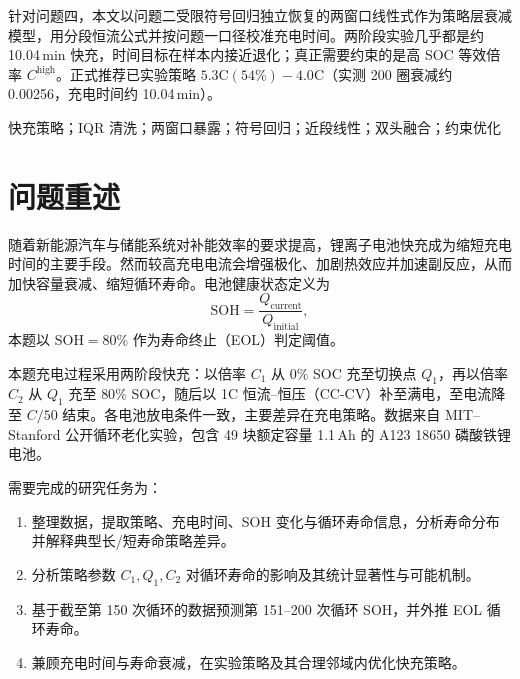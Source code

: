 \documentclass[a4paper,12pt,UTF8,zihao=-4]{ctexart}
\begin{document}
针对问题四，本文以问题二受限符号回归独立恢复的两窗口线性式作为策略层衰减模型，用分段恒流公式并按问题一口径校准充电时间。两阶段实验几乎都是约 10.04\,min 快充，时间目标在样本内接近退化；真正需要约束的是高 SOC 等效倍率 \(C^{\mathrm{high}}\)。正式推荐已实验策略 \(5.3\mathrm{C}(54\%)-4.0\mathrm{C}\)（实测 200 圈衰减约 0.00256，充电时间约 10.04\,min）。

\vspace{0.8em}
快充策略；IQR 清洗；两窗口暴露；符号回归；近段线性；双头融合；约束优化

\clearpage

\section{问题重述}

随着新能源汽车与储能系统对补能效率的要求提高，锂离子电池快充成为缩短充电时间的主要手段。然而较高充电电流会增强极化、加剧热效应并加速副反应，从而加快容量衰减、缩短循环寿命\cite{severson2019datadriven,liu2019fastcharging,ahmed2017enabling}。电池健康状态定义为
\begin{equation}
\mathrm{SOH}=\frac{Q_{\mathrm{current}}}{Q_{\mathrm{initial}}},
\label{eq:soh}
\end{equation}
本题以 \(\mathrm{SOH}=80\%\) 作为寿命终止（EOL）判定阈值。

本题充电过程采用两阶段快充：以倍率 \(C_1\) 从 \(0\%\) SOC 充至切换点 \(Q_1\)，再以倍率 \(C_2\) 从 \(Q_1\) 充至 \(80\%\) SOC，随后以 1C 恒流--恒压（CC-CV）补至满电，至电流降至 \(C/50\) 结束。各电池放电条件一致，主要差异在充电策略。数据来自 MIT--Stanford 公开循环老化实验\cite{severson2019datadriven,matrdataset}，包含 49 块额定容量 1.1\,Ah 的 A123 18650 磷酸铁锂电池。

需要完成的研究任务为：
\begin{enumerate}[label=\textbf{问题\arabic*.}]
  \item 整理数据，提取策略、充电时间、SOH 变化与循环寿命信息，分析寿命分布并解释典型长/短寿命策略差异。
  \item 分析策略参数 \(C_1,Q_1,C_2\) 对循环寿命的影响及其统计显著性与可能机制。
  \item 基于截至第 150 次循环的数据预测第 151--200 次循环 SOH，并外推 EOL 循环寿命。
  \item 兼顾充电时间与寿命衰减，在实验策略及其合理邻域内优化快充策略。
\end{enumerate}
\end{document}
